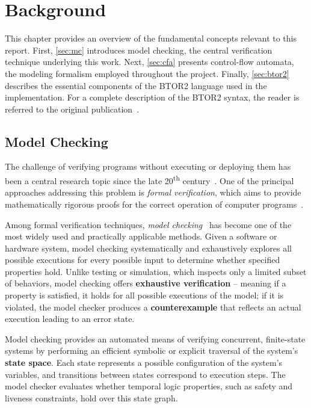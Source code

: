 \chapter{Background}

This chapter provides an overview of the fundamental concepts relevant to this report.
First, \autoref{sec:mc} introduces model checking, the central verification technique underlying this work.
Next, \autoref{sec:cfa} presents control-flow automata, the modeling formalism employed throughout the project.
Finally, \autoref{sec:btor2} describes the essential components of the BTOR2 language used in the implementation. For a complete description of the BTOR2 syntax, the reader is referred to the original publication~\cite{btor2}.


\section{Model Checking}\label{sec:mc}

The challenge of verifying programs without executing or deploying them has been a central research topic since the late 20\textsuperscript{th} century~\cite{systemEngineering}. One of the principal approaches addressing this problem is \textit{formal verification}, which aims to provide mathematically rigorous proofs for the correct operation of computer programs~\cite{MC}.

Among formal verification techniques, \textit{model checking}~\cite{modelChecking, modelChecking2} has become one of the most widely used and practically applicable methods. Given a software or hardware system, model checking systematically and exhaustively explores all possible executions for every possible input to determine whether specified properties hold. Unlike testing or simulation, which inspects only a limited subset of behaviors, model checking offers \textbf{exhaustive verification} -- meaning if a property is satisfied, it holds for all possible executions of the model; if it is violated, the model checker produces a \textbf{counterexample} that reflects an actual execution leading to an error state.

Model checking provides an automated means of verifying concurrent, finite-state systems by performing an efficient symbolic or explicit traversal of the system's \textbf{state space}. Each state represents a possible configuration of the system's variables, and transitions between states correspond to execution steps. The model checker evaluates whether temporal logic properties, such as safety and liveness constraints, hold over this state graph.~\cite{hardware_MC}

